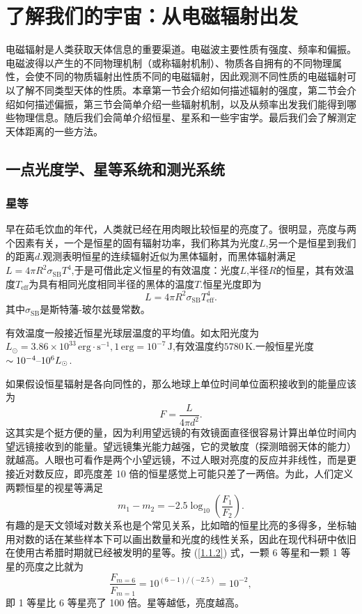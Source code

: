 \documentclass[../天体物理基础.tex]{subfiles}
\begin{document}
\section{了解我们的宇宙：从电磁辐射出发}
电磁辐射是人类获取天体信息的重要渠道。电磁波主要性质有强度、频率和偏振。电磁波得以产生的不同物理机制（或称辐射机制）、物质各自拥有的不同物理属性，会使不同的物质辐射出性质不同的电磁辐射，因此观测不同性质的电磁辐射可以了解不同类型天体的性质。本章第一节会介绍如何描述辐射的强度，第二节会介绍如何描述偏振，第三节会简单介绍一些辐射机制，以及从频率出发我们能得到哪些物理信息。随后我们会简单介绍恒星、星系和一些宇宙学。最后我们会了解测定天体距离的一些方法。

\subsection{一点光度学、星等系统和测光系统}
\subsubsection{星等}
早在茹毛饮血的年代，人类就已经在用肉眼比较恒星的亮度了。很明显，亮度与两个因素有关，一个是恒星的固有辐射功率，我们称其为光度$L$,另一个是恒星到我们的距离$d$.观测表明恒星的连续辐射近似为黑体辐射，而黑体辐射满足$L=4\pi R^{2}\sigma_{\mathrm{SB}}T^{4}$,于是可借此定义恒星的有效温度：光度$L$,半径$R$的恒星，其有效温度$T_{\mathrm{eff}}$为具有相同光度相同半径的黑体的温度$T$.恒星光度即为
\begin{equation}
L=4\pi R^{2}\sigma_{\mathrm{SB}}T_{\text{eff}}^{4}.
\end{equation}
其中$\sigma_{\text{SB}}$是斯特藩{}-{}玻尔兹曼常数。

有效温度一般接近恒星光球层温度的平均值。如太阳光度为$L_{\odot}=3.86\times10^{33}\,\mathrm{erg\cdot s^{-1}},1\,\mathrm{erg}=10^{-7}\,\mathrm{J}$,有效温度约$5780\,\mathrm{K}$.一般恒星光度$\sim10^{-4}\text{\textendash}10^{6}L_{\odot}$.

如果假设恒星辐射是各向同性的，那么地球上单位时间单位面积接收到的能量应该为
\begin{equation}
F=\frac{L}{4\pi d^{2}}.
\end{equation}
这其实是个挺方便的量，因为利用望远镜的有效镜面直径很容易计算出单位时间内望远镜接收到的能量。望远镜集光能力越强，它的灵敏度（探测暗弱天体的能力）就越高。人眼也可看作是两个小望远镜，不过人眼对亮度的反应并非线性，而是更接近对数反应，即亮度差 10 倍的恒星感觉上可能只差了一两倍。为此，人们定义两颗恒星的视星等满足
\begin{equation}
m_{1}-m_{2}=-2.5\log_{10}\left(\frac{F_{1}}{F_{2}}\right).\label{1.1.2}
\end{equation}
有趣的是天文领域对数关系也是个常见关系，比如暗的恒星比亮的多得多，坐标轴用对数的话在某些样本下可以画出数量和光度的线性关系，因此在现代科研中依旧在使用古希腊时期就已经被发明的星等。按 (\ref{1.1.2}) 式，一颗 6 等星和一颗 1 等星的亮度之比就为
\begin{equation}
\frac{F_{m=6}}{F_{m=1}}=10^{\left(6-1\right)/\left(-2.5\right)}=10^{-2},
\end{equation}
即 1 等星比 6 等星亮了 100 倍。星等越低，亮度越高。
\end{document}
